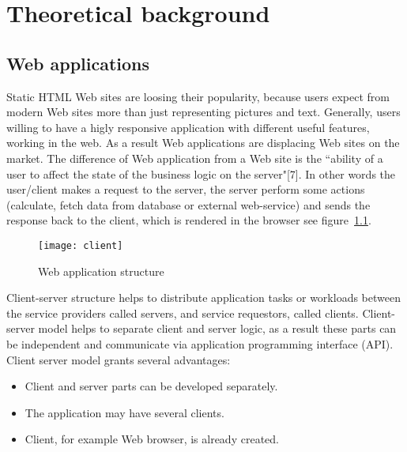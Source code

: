 \chapter{Theoretical background}
\label{ch:background} 
	\section{Web applications}
		
		
	  Static HTML Web sites are loosing their popularity, because users
	  expect from modern Web sites more than just representing pictures and text.
	  Generally, users willing to have a higly responsive application with different useful
	  features, working in the web. As a result Web applications are displacing Web
	  sites on the market. The difference of Web application from a Web site is the
	 ``ability of a user to affect the state of the business logic on the
	 server"[7]. In other words the user/client makes a request to the server, the
	 server perform some actions (calculate, fetch data from database or external web-service) and
	  sends the response back to the client, which is rendered in the browser see
	  figure~\ref{fig:clientserver}.
	  \begin{figure}
	  \label{fig:clientserver}
      	\texttt{[image: client]}
      	\caption{Web application structure}
      \end{figure}
	  
    	Client-server structure helps to distribute application tasks or workloads
    	between the service providers called servers, and service requestors,
    	called clients. Client-server model helps to separate client and server logic, as
    	a result these parts can be independent and communicate via application
    	programming interface (API). Client server model grants several advantages:
    	\begin{itemize}
    	  \item Client and server parts can be developed separately.
    	  \item The application may have several clients.
    	  \item Client, for example Web browser, is already created.
    	\end{itemize}
    		
